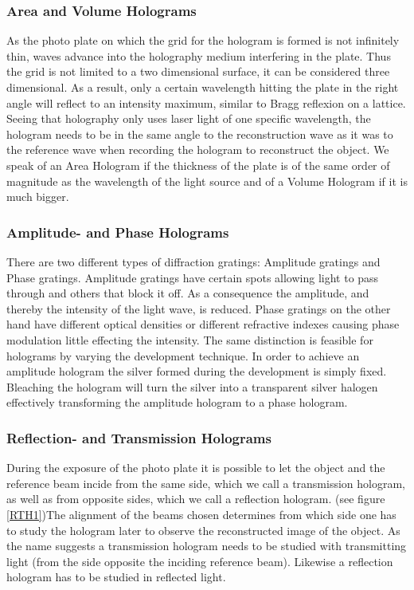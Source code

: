 \subsubsection{Area and Volume Holograms}

As the photo plate on which the grid for the hologram is formed is not infinitely thin, waves advance into the holography medium interfering in the plate. Thus the grid is not limited to a two dimensional surface, it can be considered three dimensional. As a result, only a certain wavelength hitting the plate in the right angle will reflect to an intensity maximum, similar to Bragg reflexion on a lattice. Seeing that holography only uses laser light of one specific wavelength, the hologram needs to be in the same angle to the reconstruction wave as it was to the reference wave when recording the hologram to reconstruct the object.
We speak of an Area Hologram if the thickness of the plate is of the same order of magnitude as the  wavelength of the light source and of a Volume Hologram if it is much bigger.


\subsubsection{Amplitude- and Phase Holograms}

There are two different types of diffraction gratings: Amplitude gratings and Phase gratings. Amplitude gratings have certain spots allowing light to pass through and others that block it off. As a consequence the amplitude, and thereby the intensity of the light wave, is reduced. Phase gratings on the other hand have different optical densities or different refractive indexes causing phase modulation little effecting the intensity.
The same distinction is feasible for holograms by varying the development technique. In order to achieve an amplitude hologram the silver formed during the development is simply fixed. Bleaching the hologram will turn the silver into a transparent silver halogen effectively transforming the amplitude hologram to a phase hologram. 

\subsubsection{Reflection- and Transmission Holograms \label{ReflTrans}}

During the exposure of the photo plate it is possible to let the object and the reference beam incide from the same side, which we call a transmission hologram, as well as from opposite sides, which we call a reflection hologram. (see figure \ref{RTH1})The alignment of the beams chosen determines from which side one has to study the hologram later to observe the reconstructed image of the object.
As the name suggests a transmission hologram needs to be studied with transmitting light (from the side opposite the inciding reference beam). Likewise a reflection hologram has to be studied in reflected light.

